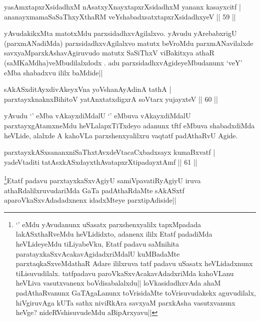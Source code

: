 
\begin{shl}
yasAmxtapxrXsidadhxM nAsatxyXnayxtapxrXsidadhxM yananx kasayxcitf |\\
ananayxmamaSaSaThxyXthaRM veYshabadxsatxtapxrXsidadhxyeV \hfill || 59 ||
\end{shl}

\begin{artha}
yAvudakikxMta matotxMdu parxsidadhxvAgilalxvo. yAvudu yArebabxrigU (parxmANadiMda) parxsidadhxvAgilalxvo matutx beVroMdu parxmANavilalxde savxyaMparxkAshavAgiruvudo matutx SaSiThxV viBakitxya athaR (saMKaMdha)veMbudilalxdodx . adu parxsidadhxvAgideyeMbudanunx `veY' eMba shabadxvu ililx baMdide||
\end{artha}


\begin{shl}
sAkASxditAyxdivAkeyxVna yoV\s shanAyAdinA tathA |\\
parxtayxknaknxBihitoV yatAnxtatxdigxrA soV\s tarx yujayxteV \hfill || 60 ||
\end{shl}

\begin{artha}
yAvudu `\stext ' eMba vAkayxdiMdalU `\stext ' eMbuva vAkayxdiMdalU parxtayxgAtamxneMdu heVLalapxTiTxdeyo adanunx tftf eMbuva shabadxdiMda heVLide, alalxde A kahoVLa parxshenxyalilxru vaqtatf padAthaRvU Agide.
\end{artha}


\begin{shl}
parxtayxkASxsananxniSaThxtAvxdeVtacaCxbadxsayx kumaBxvatf |\\
yadeVtaditi tatAsxkASxdayxthAvatapxrXtipadayxtAmf \hfill || 61 ||
\end{shl}

\begin{artha}
\footnote[1]{`\stext ' eMdu yAvudanunx uSasatx parxshenxyalilx tapxMpadada lakASxthaRveMdu heVLididxto, adanenx ililx Etatf padadiMda heVLideyeMdu tiLiyabeVku, Etatf padavu saMnihita paratayxkaSxvAcakavAgidadxriMdalU kuMBadaMte parxtaqkaSxveMdathaR Adare ililxruva tatf padavu uSasatx heVLidadxnunx tiLisuvudilalx. tatfpadavu paroVkaSxvAcakavAdadxriMda kahoVLanu heVLiva vasutxvanenx boVdisabalalxdu|| loVkasidadhxvAda ahaM padAthaRvanunx GaTAgaLanunx toVrisidaMte toVrisuvudakekx aguvudilalx, hiVgiruvAga kUTa sathx niviRkAra savxyaM parxkAsha vasutxvanunx heVge? nideRVshisuvudeMdu aBipArxyavu||}Etatf padavu parxtayxkaSxvAgiyU samiVpavatiRyAgiyU iruva athaRdalilxruvudariMda GaTa padAthaRdaMte sAkASxtf aparoVkaSxvAdadadxnenx idadxMteye parxtipAdiside||
\end{artha}

